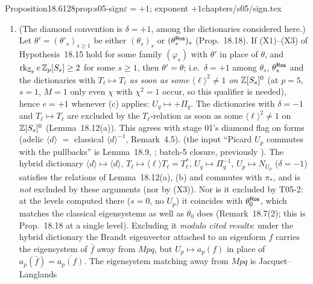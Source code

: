 \begin{quoted}{Proposition}{18.6}{128}{prop:s05-sign}{$\varepsilon=+1$; exponent $+1$}{chapters/s05/sign.tex}
\begin{enumerate}[label=(\alph*)]
  some character $\chi$ of $(\Z/N)^\times$ with $\chi(q)\ne\pm1$ occurs in the adelic diamond action on it), then $e=\delta$. If
  $\langle q\rangle^2=1$ there (e.g.\ $N\le2$, or $q^2\equiv\pm1\bmod N$: only even $\chi$ occur, since $\langle-1\rangle=1$ on the class set,
  see the proof), the relation imposes nothing. \stpmc{}; checked numerically in T05-2, Remark~18.7(2).
\item (The diamond convention is $\delta=+1$, among the dictionaries considered here.) Let $\theta'=(\theta'_s)_{s\ge1}$ be either $(\theta_s)_s$ or $(\theta^{\mathsf{Ros}}_s)_s$
  (Prop.~18.18). If (X1)--(X3) of Hypothesis~18.15 hold for some family $(\varphi_s)$ with $\theta'$ in place of $\theta$,
  and $\operatorname{rk}_{\mathbb{Z}_p}e\,\mathbb{Z}_p[S_s]\ge2$ for some $s\ge1$, then $\theta'=\theta$; i.e.\ $\delta=+1$ among $\theta_s$, $\theta^{\mathsf{Ros}}_s$ and the dictionaries with $T_\ell\mapsto T_\ell$ \emph{as soon as some $\langle\ell\rangle^2\ne1$ on $\mathbb{Z}[S_s]^0$} (at $p=5$, $s=1$, $M=1$ only even $\chi$ with $\chi^2=1$ occur, so this qualifier is needed), hence $e=+1$ whenever (c) applies:
  $U_q\mapsto+\Pi_q$. The dictionaries with $\delta=-1$ and $T_\ell\mapsto T_\ell$ are excluded by the $T_\ell$-relation as soon as some
  $\langle\ell\rangle^2\ne1$ on $\mathbb{Z}[S_s]^0$ (Lemma~18.12(a)). This agrees with stage 01's diamond flag on forms (adelic
  $\langle d\rangle$ $=$ classical $\langle d\rangle^{-1}$, Remark~4.5). \stpmc{} (the input ``Picard $U_p$ commutes with the
  pullbacks'' is Lemma~18.9, \stpmc; batch-5 closure, previously \sttoprove). The hybrid dictionary $\langle d\rangle\mapsto\langle d\rangle$, $T_\ell\mapsto\langle\ell\rangle T_\ell=T_\ell^*$, $U_q\mapsto\Pi_q^{-1}$, $U_p\mapsto N_{U_p}$ ($\delta=-1$) satisfies the
  relations of Lemma~18.12(a), (b) and commutes with $\pi_*$, and is \emph{not} excluded by these arguments (nor by (X3)). Nor is it excluded by T05-2: at the levels computed there ($s=0$, no $U_p$) it
  coincides with $\theta^{\mathsf{Ros}}_0$, which matches the classical eigensystems as well as $\theta_0$ does (Remark~18.7(2); this is
  Prop.~18.18 at a single level). Excluding it \emph{modulo cited results}: under the hybrid dictionary the Brandt eigenvector attached to an eigenform $f$ carries the eigensystem of $\bar f$ away from $Mpq$, but $U_p\mapsto a_p(f)$ in place of $a_p(\bar f)=\overline{a_p(f)}$. The eigensystem matching away from $Mpq$ is Jacquet--Langlands

\end{enumerate}
\end{quoted}
